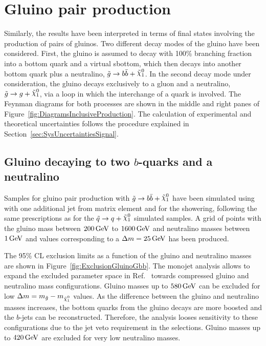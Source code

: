 \section{Gluino pair production}
    \label{sec:GluinoProduction}

Similarly, the results have been interpreted in terms of final states involving the production of pairs of gluinos.
Two different decay modes of the gluino have been considered.
First, the gluino is assumed to decay with 100\% branching fraction into a bottom quark and a virtual sbottom, which then decays into another bottom quark plus a neutralino, $\gluinotobb$.
In the second decay mode under consideration, the gluino decays exclusively to a gluon and a neutralino, $\gluinotog$, via a loop in which the interchange of a quark is involved.
The Feynman diagrams for both processes are shown in the middle and right panes of Figure~\ref{fig:DiagramsInclusiveProduction}.
The calculation of experimental and theoretical uncertainties follows the procedure explained in Section~\ref{sec:SysUncertaintiesSignal}.


\subsection{Gluino decaying to two $b$-quarks and a neutralino}

Samples for gluino pair production with $\gluinotobb$ have been simulated using \madgraph{} with one additional jet from matrix element and  for the showering, following the same prescriptions as for the $\squarktoq$ simulated samples.
A grid of points with the gluino mass between $\unit[200]{GeV}$ to $\unit[1600]{GeV}$ and neutralino masses between $\unit[1]{GeV}$ and values corresponding to a $\Delta m = \unit[25]{GeV}$ has been produced.

The 95\% CL exclusion limits as a function of the gluino and neutralino masses are shown in Figure~\ref{fig:ExclusionGluinoGbb}.
The monojet analysis allows to expand the excluded parameter space in Ref.~\cite{TheATLAScollaboration:2013tha} towards compressed gluino and neutralino mass configurations.
Gluino masses up to $\unit[580]{GeV}$ can be excluded for low $\Delta m = m_{\gluino} - m_{\ninoone}$ values.
As the difference between the gluino and neutralino masses increases, the bottom quarks from the gluino decays are more boosted and the $b$-jets can be reconstructed.
Therefore, the analysis looses sensitivity to these configurations due to the jet veto requirement in the selections.
Gluino masses up to $\unit[420]{GeV}$ are excluded for very low neutralino masses.

